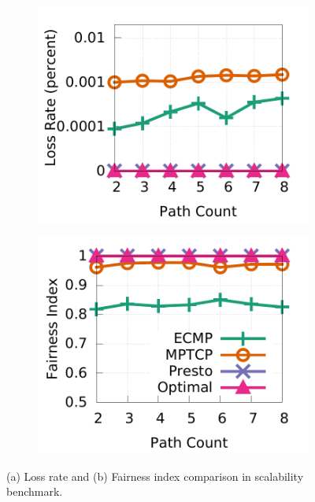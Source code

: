 \begin{figure}[t]
        \centering
	\centering
        \begin{subfigure}[b]{0.225\textwidth}
                \centering
		\includegraphics[width=\textwidth]{presto/figures/scalability_test/scalability_compare_loss.pdf}
		\caption{}
		\label{micro_scalability_test_loss}
        \end{subfigure}
        \begin{subfigure}[b]{0.225\textwidth}
  		\includegraphics[width=\textwidth]{presto/figures/scalability_test/scalability_compare_fairness.pdf}
        	\caption{}
        	\label{micro_scalability_test_fairness}
	\end{subfigure}
	\caption{(a) Loss rate and (b) Fairness index comparison in scalability benchmark.}
\end{figure}

